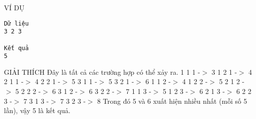 VÍ DỤ
\begin{verbatim}
Dữ liệu
3 2 3

Kết quả
5
\end{verbatim}
GIẢI THÍCH
Đây là tất cả các trường hợp có thể xảy ra. 1 1 1 -$>$ 3  1 2 1 -$>$ 4  2 1 1 -$>$ 4  2 2 1 -$>$ 5  3 1 1 -$>$ 5  3 2 1 -$>$ 6 1 1 2 -$>$ 4  1 2 2 -$>$ 5  2 1 2 -$>$ 5  2 2 2 -$>$ 6  3 1 2 -$>$ 6  3 2 2 -$>$ 7 1 1 3 -$>$ 5  1 2 3 -$>$ 6  2 1 3 -$>$ 6  2 2 3 -$>$ 7  3 1 3 -$>$ 7  3 2 3 -$>$ 8 Trong đó 5 và 6 xuất hiện nhiều nhất (mỗi số 5 lần), vậy 5 là kết quả.